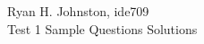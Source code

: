 \documentclass{article}
\begin{document}

\begin{center}
    Ryan H. Johnston, ide709\\
    Test 1 Sample Questions Solutions
\end{center}




\end{document}
